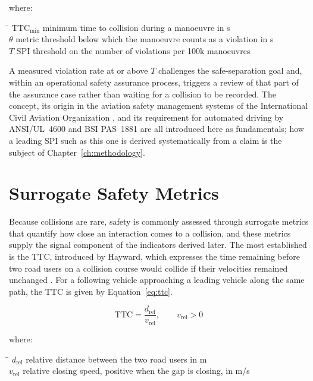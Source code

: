 where:\nopagebreak
\begin{tabbing}
    \hspace{2.2cm} \= \kill
    $\mathrm{TTC}_{\min}$ \> minimum time to collision during a manoeuvre in s \\
    $\theta$ \> metric threshold below which the manoeuvre counts as a violation in s \\
    $T$ \> SPI threshold on the number of violations per 100k manoeuvres
\end{tabbing}

A measured violation rate at or above $T$ challenges the
safe-separation goal and, within an operational safety assurance process, triggers a
review of that part of the assurance case rather than waiting for a collision to be
recorded. The concept, its origin in the aviation safety management systems of the
International Civil Aviation Organization \cite{icao9859}, and its requirement for
automated driving by ANSI/UL~4600 \cite{ul4600} and BSI PAS~1881 \cite{pas1881} are all
introduced here as fundamentals; how a leading \ac{SPI} such as this one is derived
systematically from a claim is the subject of Chapter~\ref{ch:methodology}.

\section{Surrogate Safety Metrics}
\label{sec:fund_metrics}

Because collisions are rare, safety is commonly assessed through surrogate metrics that
quantify how close an interaction comes to a collision, and these metrics supply the
signal component of the indicators derived later. The most established is the
\ac{TTC}, introduced by Hayward, which expresses the time remaining before two road
users on a collision course would collide if their velocities remained unchanged
\cite{hayward1972ttc}. For a following vehicle approaching a leading vehicle along the
same path, the \ac{TTC} is given by Equation~\eqref{eq:ttc}.

\begin{equation}
    \mathrm{TTC} = \frac{d_\mathrm{rel}}{v_\mathrm{rel}}, \qquad v_\mathrm{rel} > 0
    \label{eq:ttc}
\end{equation}

where:\nopagebreak
\begin{tabbing}
    \hspace{2.2cm} \= \kill
    $d_\mathrm{rel}$ \> relative distance between the two road users in m \\
    $v_\mathrm{rel}$ \> relative closing speed, positive when the gap is closing, in m/s
\end{tabbing}

